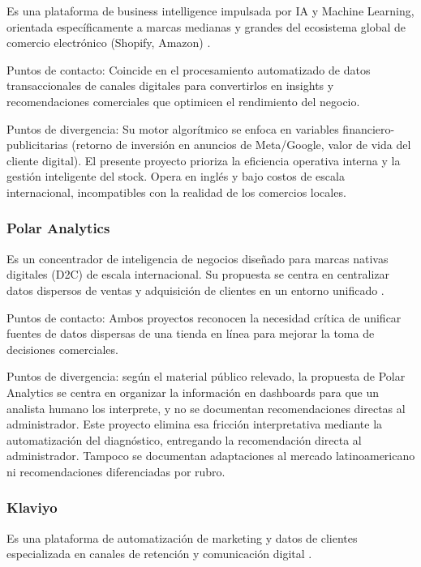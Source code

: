 Es una plataforma de business intelligence impulsada por IA y Machine Learning, orientada específicamente a marcas medianas y grandes del ecosistema global de comercio electrónico (Shopify, Amazon) \parencite{Conjura2025}.

Puntos de contacto: Coincide en el procesamiento automatizado de datos transaccionales de canales digitales para convertirlos en insights y recomendaciones comerciales que optimicen el rendimiento del negocio.

Puntos de divergencia: Su motor algorítmico se enfoca en variables financiero-publicitarias (retorno de inversión en anuncios de Meta/Google, valor de vida del cliente digital). El presente proyecto prioriza la eficiencia operativa interna y la gestión inteligente del stock. Opera en inglés y bajo costos de escala internacional, incompatibles con la realidad de los comercios locales.

\subsubsection{Polar Analytics}
\label{sec:polar}

Es un concentrador de inteligencia de negocios diseñado para marcas nativas digitales (D2C) de escala internacional. Su propuesta se centra en centralizar datos dispersos de ventas y adquisición de clientes en un entorno unificado \parencite{PolarAnalytics2025}.

Puntos de contacto: Ambos proyectos reconocen la necesidad crítica de unificar fuentes de datos dispersas de una tienda en línea para mejorar la toma de decisiones comerciales.

Puntos de divergencia: según el material público relevado, la propuesta de Polar Analytics se centra en organizar la información en dashboards para que un analista humano los interprete, y no se documentan recomendaciones directas al administrador. Este proyecto elimina esa fricción interpretativa mediante la automatización del diagnóstico, entregando la recomendación directa al administrador. Tampoco se documentan adaptaciones al mercado latinoamericano ni recomendaciones diferenciadas por rubro.

\subsubsection{Klaviyo}
\label{sec:klaviyo}

Es una plataforma de automatización de marketing y datos de clientes especializada en canales de retención y comunicación digital \parencite{Klaviyo2025}.

